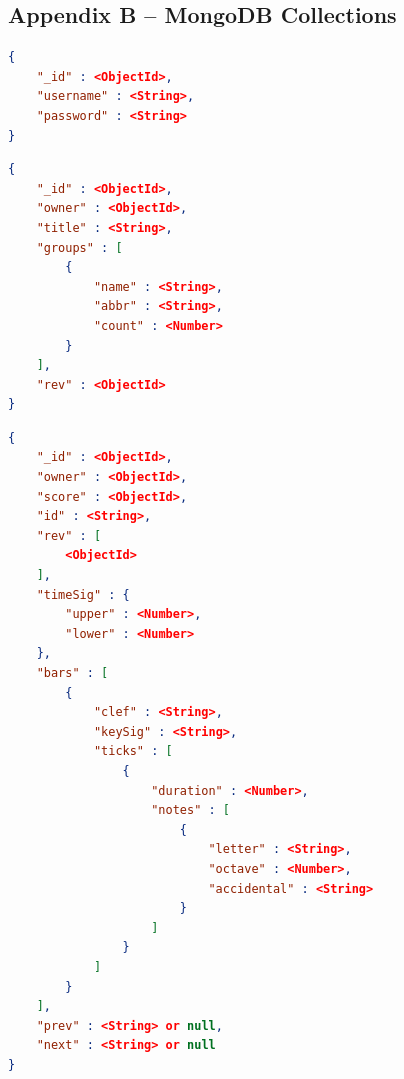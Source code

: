 \documentclass[letterpaper,12pt]{article}
\begin{document}
\subsection{Appendix B -- MongoDB Collections}

\begin{lstlisting}[language=json, caption=users]
{
    "_id" : <ObjectId>,
    "username" : <String>,
    "password" : <String>
}
\end{lstlisting}

\begin{lstlisting}[language=json, caption=musicScores]
{
    "_id" : <ObjectId>,
    "owner" : <ObjectId>,
    "title" : <String>,
    "groups" : [
        {
            "name" : <String>,
            "abbr" : <String>,
            "count" : <Number>
        }
    ],
    "rev" : <ObjectId>
}
\end{lstlisting}

\begin{lstlisting}[language=json, caption=measures]
{
    "_id" : <ObjectId>,
    "owner" : <ObjectId>,
    "score" : <ObjectId>,
    "id" : <String>,
    "rev" : [
        <ObjectId>
    ],
    "timeSig" : {
        "upper" : <Number>,
        "lower" : <Number>
    },
    "bars" : [
        {
            "clef" : <String>,
            "keySig" : <String>,
            "ticks" : [
                {
                    "duration" : <Number>,
                    "notes" : [
                        {
                            "letter" : <String>,
                            "octave" : <Number>,
                            "accidental" : <String>
                        }
                    ]
                }
            ]
        }
    ],
    "prev" : <String> or null,
    "next" : <String> or null
}
\end{lstlisting}
\end{document}
